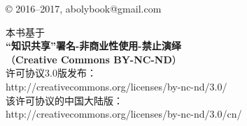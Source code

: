 \thispagestyle{empty}

\begin{center}
© 2016--2017, abolybook@gmail.com
\medskip

本书基于\\
\textbf{“知识共享”署名-非商业性使用-禁止演绎}\\
（\textbf{Creative Commons BY-NC-ND}）\\
许可协议3.0版发布：\\
http://creativecommons.org/licenses/by-nc-nd/3.0/\\
该许可协议的中国大陆版：\\
http://creativecommons.org/licenses/by-nc-nd/3.0/cn/
\end{center}
